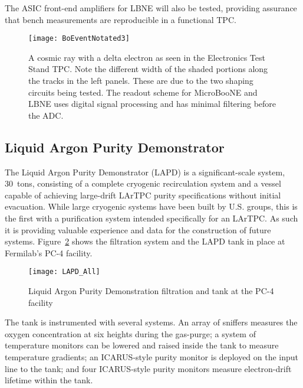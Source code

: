 The ASIC front-end amplifiers for LBNE will also be tested, providing assurance that bench measurements are reproducible in a functional TPC.

\begin{figure}
\centering 
{\texttt{[image: BoEventNotated3]}}
\caption[Cosmic ray with a delta electron as seen in the Electronics Test Stand TPC]{A cosmic ray with a delta electron as seen in the Electronics Test Stand TPC. Note the different width of the shaded portions along the tracks in the left panels. These are due to the two shaping circuits being tested. 
The readout scheme for MicroBooNE and LBNE uses digital signal processing and has minimal filtering before the ADC.}
\label{BoData}
\end{figure}


\subsection{Liquid Argon Purity Demonstrator}
\label{sec:lapd}
The Liquid Argon Purity Demonstrator (LAPD) is a significant-scale system, 
30~tons, consisting of a complete cryogenic recirculation system and a vessel capable of achieving large-drift LArTPC purity specifications without initial evacuation.
While large cryogenic systems have been built by U.S. groups,  
this is the first with a purification system intended specifically for an LArTPC.
As such it is providing valuable experience and data for the construction of future systems. Figure~\ref{LAPD} shows the filtration system and the LAPD tank in place at Fermilab's PC-4 facility.

\begin{figure}
\centering 
{\texttt{[image: LAPD\_All]}}
\caption{Liquid Argon Purity Demonstration filtration and tank at the PC-4 facility}
\label{LAPD}
\end{figure}

The tank is instrumented with several systems. An array of sniffers measures the oxygen concentration at six heights during the gas-purge; a system of temperature monitors can be lowered and raised inside the tank to measure temperature gradients; an ICARUS-style purity monitor is deployed on the input line to the tank; and four ICARUS-style purity monitors measure electron-drift lifetime within the tank. 

